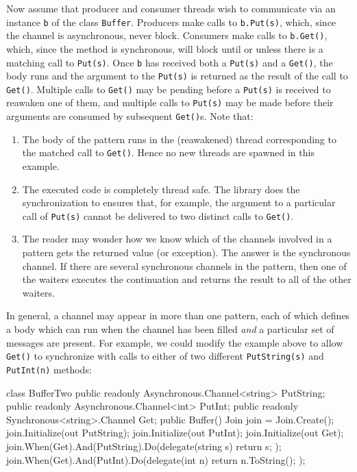\documentclass{article}
\begin{document}
Now assume that producer and consumer threads wish to communicate via
an instance \verb|b| of the class \verb|Buffer|. Producers make calls
to \verb|b.Put(s)|, which, since the channel is asynchronous, never
block. Consumers make calls to \verb|b.Get()|, which, since the method
is synchronous, will block until or unless there is a matching call to
\verb|Put(s)|. Once \verb|b| has received both a \verb|Put(s)| and a
\verb|Get()|, the body runs and the argument to the \verb|Put(s)| is
returned as the result of the call to \verb|Get()|. Multiple calls to
\verb|Get()| may be pending before a \verb|Put(s)| is received to
reawaken one of them, and multiple calls to \verb|Put(s)| may be made
before their arguments are consumed by subsequent \verb|Get()|s. Note
that:
\begin{enumerate}
\item The body of the pattern runs in the (reawakened) thread
corresponding to the matched call to \verb|Get()|. Hence no new threads are
spawned in this example.
\item The executed code  is
completely thread safe. The library does the synchronization to ensures
that, for example, the argument to a
particular call of \verb|Put(s)| cannot be delivered to two distinct calls to
\verb|Get()|. 
\item The reader may wonder how we know which of the channels involved
in a pattern gets the returned value (or exception).
The answer is the synchronous channel. If there are several synchronous channels in the pattern, then one of the waiters
executes the continuation and returns the result to all of the other waiters.
\end{enumerate}


In general, a channel
may appear in more than one pattern, each of which defines a body which
can run when the channel has been filled \emph{and} a particular set of
messages are present. For example, we could modify the
example above to allow \verb|Get()| to synchronize with calls to
either of two different \verb|PutString(s)| and \verb|PutInt(n)| methods:

\begin{lstcsharp}
class BufferTwo {
  public readonly Asynchronous.Channel<string> PutString;
  public readonly Asynchronous.Channel<int> PutInt;
  public readonly Synchronous<string>.Channel Get;
  public Buffer() { 
    Join join = Join.Create();
    join.Initialize(out PutString);  
    join.Initialize(out PutInt);  
    join.Initialize(out Get);
    join.When(Get).And(PutString).Do(delegate(string s) {
       return s; 
    });
    join.When(Get).And(PutInt).Do(delegate(int n) {
       return n.ToString(); 
    });
  }
}
\end{lstcsharp}
\end{document}
